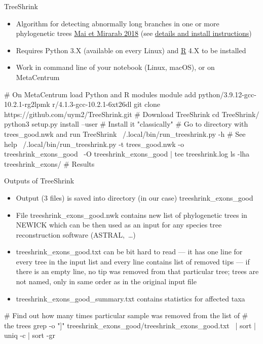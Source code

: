 \documentclass[compress,  xelatex, 11pt, xcolor=x11names, aspectratio=169,
	hyperref={
		bookmarks=true,
		unicode=true,
		colorlinks=true,
		pdftitle={HybSeq course},
		plainpages=false,
		pdfauthor={Vojtech Zeisek},
		pdfsubject={Practical processing of HybSeq target enrichment sequencing data on computing grids like MetaCentrum},
		pdfcreator={XeLaTeX},
		pdfkeywords={BASH, command line, GNU, HybSeq, Linux, MetaCentrum, sequencing shell, target enrichment},
		linkcolor=Turquoise4, %
		anchorcolor=DodgerBlue4, %
		citecolor=DodgerBlue4, %
		filecolor=DodgerBlue4, %
		menucolor=Tan4, %
		urlcolor=DarkOliveGreen4 %
		},
	url={hyphens, lowtilde} %
	]{beamer}
\renewcommand{\texttt}[1]{\colorbox{Cornsilk2}{{\ttfamily #1}}}
\begin{document}
\begin{frame}[fragile]{TreeShrink}
	\begin{itemize}
		\item Algorithm for detecting abnormally long branches in one or more phylogenetic trees \href{https://bmcgenomics.biomedcentral.com/articles/10.1186/s12864-018-4620-2}{Mai et Mirarab 2018} (see \href{https://github.com/uym2/TreeShrink}{details and install instructions})
		\item Requires Python 3.X (available on every Linux) and \href{https://www.r-project.org/}{R} 4.X to be installed
		\item Work in command line of your notebook (Linux, macOS), or on MetaCentrum
	\end{itemize}
	\begin{bashcode}
    # On MetaCentrum load Python and R modules
    module add python/3.9.12-gcc-10.2.1-rg2lpmk r/4.1.3-gcc-10.2.1-6xt26dl
    git clone https://github.com/uym2/TreeShrink.git # Download TreeShrink
    cd TreeShrink/
    python3 setup.py install --user # Install it "classically"
    # Go to directory with trees_good.nwk and run TreeShrink
    ~/.local/bin/run_treeshrink.py -h # See help
    ~/.local/bin/run_treeshrink.py -t trees_good.nwk -o treeshrink_exons_good \
      -O treeshrink_exons_good | tee treeshrink.log
    ls -lha treeshrink_exons/ # Results
	\end{bashcode}
\end{frame}

\begin{frame}[fragile]{Outputs of TreeShrink}
	\begin{itemize}
		\item Output (3 files) is saved into directory (in our case) \texttt{treeshrink\_exons\_good}
		\item File \texttt{treeshrink\_exons\_good.nwk} contains new list of phylogenetic trees in \texttt{NEWICK} which can be then used as an input for any species tree reconstruction software (ASTRAL,~\ldots)
		\item \texttt{treeshrink\_exons\_good.txt} can be bit hard to read --- it has one line for every tree in the input list and every line contains list of removed tips --- if there is an empty line, no tip was removed from that particular tree; trees are not named, only in same order as in the original input file
		\item \texttt{treeshrink\_exons\_good\_summary.txt} contains statistics for affected taxa
	\end{itemize}
	\begin{bashcode}
    # Find out how many times particular sample was removed from the list of
    # the trees
    grep -o "\<[[:graph:]]\+\>" treeshrink_exons_good/treeshrink_exons_good.txt \
      | sort | uniq -c | sort -gr
	\end{bashcode}
\end{frame}
\end{document}
